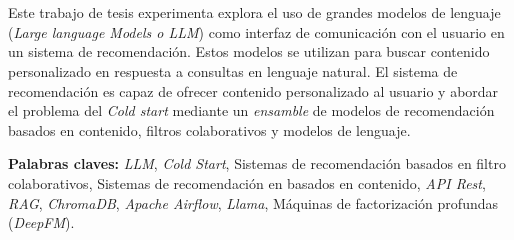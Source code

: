 \chapter*{\runtitulo}
\noindent Este trabajo de tesis experimenta explora el uso de grandes modelos de lenguaje (\textit{Large language Models o LLM})
como interfaz de comunicación con el usuario en un sistema de recomendación. Estos modelos se utilizan para buscar contenido
personalizado en respuesta a consultas en lenguaje natural. El sistema de recomendación es capaz de ofrecer contenido
personalizado al usuario y abordar el problema del \textit{Cold start} mediante un \textit{ensamble} de modelos de recomendación
basados en contenido, filtros colaborativos y modelos de lenguaje.

\bigskip

\noindent\textbf{Palabras claves:} \textit{LLM}, \textit{Cold Start}, Sistemas de recomendación basados en filtro colaborativos,
Sistemas de recomendación en basados en contenido, \textit{API Rest}, \textit{RAG}, \textit{ChromaDB},
\textit{Apache Airflow}, \textit{Llama}, Máquinas de factorización profundas (\textit{DeepFM}).